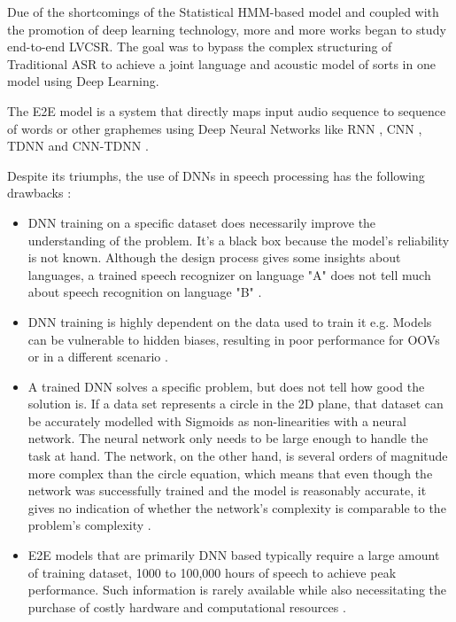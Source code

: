 
Due of the shortcomings of the Statistical HMM-based model and coupled with the promotion of deep learning technology, more and more works began to study end-to-end LVCSR. The goal was to bypass the complex structuring of Traditional ASR to achieve a joint language and acoustic model of sorts in one model using Deep Learning.

The E2E model \cite{eeckt_continual_2021} is a system that directly maps input audio sequence to sequence of words or other graphemes \cite{amodei_deep_2015-1, bell_adaptation_2020} using Deep Neural Networks like RNN \cite{sak_long_2014}, CNN \cite{abdel-hamid_exploring_2013}, TDNN \cite{kreyssig_improved_2018} and CNN-TDNN \cite{ghahremani_acoustic_2016}.

Despite its triumphs, the use of DNNs in speech processing has the following drawbacks \cite{backstrom_introduction_2022}:

\begin{itemize}
    \item DNN training on a specific dataset does necessarily improve the understanding of the problem. It's a black box because the model's reliability is not known. Although the design process gives some insights about languages, a trained speech recognizer on language "A" does not tell much about speech recognition on language "B" \cite{backstrom_introduction_2022}.
    \item DNN training is highly dependent on the data used to train it e.g. Models can be vulnerable to hidden biases, resulting in poor performance for OOVs or in a different scenario \cite{zhang_strategies_2019}.
    \item A trained DNN solves a specific problem, but does not tell how good the solution is. If a data set represents a circle in the 2D plane, that dataset can be accurately modelled with Sigmoids as non-linearities with a neural network. The neural network only needs to be large enough to handle the task at hand. The network, on the other hand, is several orders of magnitude more complex than the circle equation, which means that even though the network was successfully trained and the model is reasonably accurate, it gives no indication of whether the network's complexity is comparable to the problem's complexity \cite{backstrom_introduction_2022}.
    \item E2E models that are primarily DNN based typically require a large amount of training dataset, 1000 to 100,000 hours of speech to achieve peak performance. Such information is rarely available while also necessitating the purchase of costly hardware and computational resources \cite{kincaid_state_2018}.
    
\end{itemize}

